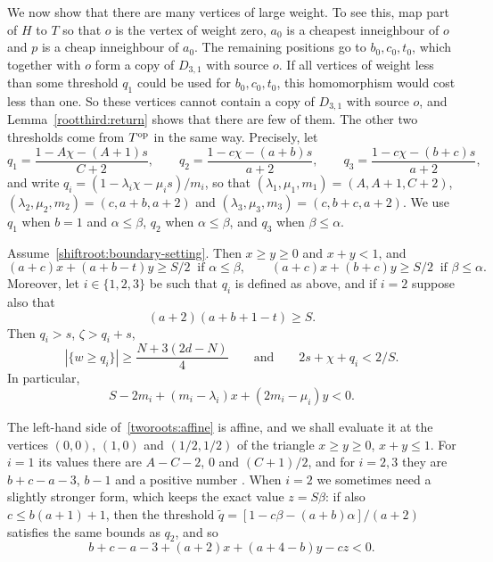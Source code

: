We now show that there are many vertices of large weight. To see this, map part of $H$ to $T$ so that $o$ is the vertex of weight zero, $a_0$ is a cheapest inneighbour of $o$ and $p$ is a cheap inneighbour of $a_0$. The remaining positions go to $b_0,c_0,t_0$, which together with $o$ form a copy of $D_{3,1}$ with source $o$. If all vertices of weight less than some threshold $q_1$ could be used for $b_0,c_0,t_0$, this homomorphism would cost less than one. So these vertices cannot contain a copy of $D_{3,1}$ with source $o$, and Lemma~\ref{rootthird:return} shows that there are few of them. The other two thresholds come from $T^{\rm op}$ in the same way. Precisely, let
\begin{equation}\label{tworoots:tail-table}
 q_1=\frac{1-A\chi-(A+1)s}{C+2},\qquad
 q_2=\frac{1-c\chi-(a+b)s}{a+2},\qquad
 q_3=\frac{1-c\chi-(b+c)s}{a+2},
\end{equation}
and write $q_i=(1-\lambda_i\chi-\mu_is)/m_i$, so that $(\lambda_1,\mu_1,m_1)=(A,A+1,C+2)$, $(\lambda_2,\mu_2,m_2)=(c,a+b,a+2)$ and $(\lambda_3,\mu_3,m_3)=(c,b+c,a+2)$. We use $q_1$ when $b=1$ and $\alpha\le\beta$, $q_2$ when $\alpha\le\beta$, and $q_3$ when $\beta\le\alpha$.

\begin{lemma}
\label{tworoots:four-tails}\label{ascentbudget:unrestricted-tails}
\label{singlemiddle:retained-price}
Assume~\eqref{shiftroot:boundary-setting}. Then $x\ge y\ge0$ and $x+y<1$, and
\begin{equation}\label{tworoots:maximum-constraint}
 (a+c)x+(a+b-t)y\ge S/2\ \text{ if }\alpha\le\beta,\qquad
 (a+c)x+(b+c)y\ge S/2\ \text{ if }\beta\le\alpha.
\end{equation}
Moreover, let $i\in\{1,2,3\}$ be such that $q_i$ is defined as above, and if $i=2$ suppose also that
\begin{equation}\label{tworoots:comparison-two}
 (a+2)(a+b+1-t)\ge S.
\end{equation}
Then $q_i>s$, $\zeta>q_i+s$,
\begin{equation}\label{ascentbudget:unrestricted-tail-bound}
 |\{w\ge q_i\}|\ge\frac{N+3(2d-N)}4\qquad\text{and}\qquad 2s+\chi+q_i<2/S.
\end{equation}
In particular,
\begin{equation}\label{tworoots:affine}
 S-2m_i+(m_i-\lambda_i)x+(2m_i-\mu_i)y<0.
\end{equation}
\end{lemma}

The left-hand side of~\eqref{tworoots:affine} is affine, and we shall evaluate it at the vertices $(0,0)$, $(1,0)$ and $(1/2,1/2)$ of the triangle $x\ge y\ge0$, $x+y\le1$. For $i=1$ its values there are $A-C-2$, $0$ and $(C+1)/2$, and for $i=2,3$ they are $b+c-a-3$, $b-1$ and a positive number .
When $i=2$ we sometimes need a slightly stronger form, which keeps the exact value $z=S\beta$: if also $c\le b(a+1)+1$, then the threshold
$\widetilde q=[1-c\beta-(a+b)\alpha]/(a+2)$ satisfies the same bounds as $q_2$, and so
\begin{equation}\label{singlemiddle:refined-affine}
 b+c-a-3+(a+2)x+(a+4-b)y-cz<0.
\end{equation}

